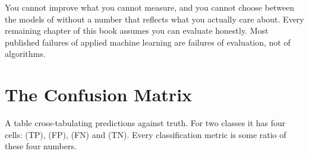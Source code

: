 You cannot improve what you cannot measure, and you cannot choose between the
models of  without a number that reflects what you actually
care about. Every remaining chapter of this book assumes you can evaluate honestly.
Most published failures of applied machine learning are failures of evaluation, not
of algorithms.

\section{The Confusion Matrix}

\begin{definitionbox}
A table cross-tabulating predictions against truth. For two classes it has four
cells:  (TP),  (FP),  (FN) and  (TN). Every classification metric is
some ratio of these four numbers.
\end{definitionbox}

